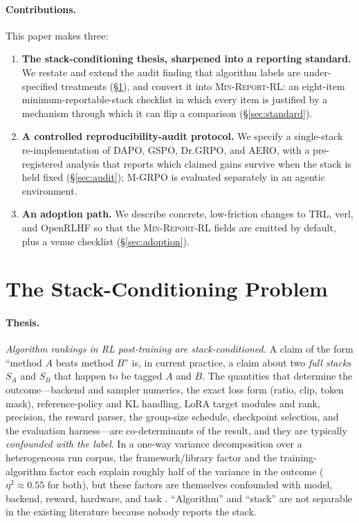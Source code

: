 \documentclass[11pt]{article}
\newcommand{\minreport}{\textsc{Min-Report-RL}}
\begin{document}
\paragraph{Contributions.}
This paper makes three:
\begin{enumerate}[leftmargin=1.6em, itemsep=2pt]
  \item \textbf{The stack-conditioning thesis, sharpened into a reporting
        standard.} We restate and extend the audit finding that algorithm
        labels are under-specified treatments (\S\ref{sec:stack}), and convert
        it into \minreport{}: an eight-item minimum-reportable-stack checklist
        in which every item is justified by a mechanism through which it can
        flip a comparison (\S\ref{sec:standard}).
  \item \textbf{A controlled reproducibility-audit protocol.} We specify a
        single-stack re-implementation of DAPO, GSPO, Dr.GRPO, and AERO,
        with a pre-registered analysis that reports which claimed gains survive
        when the stack is held fixed (\S\ref{sec:audit}); M-GRPO is evaluated
        separately in an agentic environment.
  \item \textbf{An adoption path.} We describe concrete, low-friction changes
        to TRL, verl, and OpenRLHF so that the \minreport{} fields are emitted
        by default, plus a venue checklist (\S\ref{sec:adoption}).
\end{enumerate}

\section{The Stack-Conditioning Problem}
\label{sec:stack}


\paragraph{Thesis.}
\emph{Algorithm rankings in RL post-training are stack-conditioned.} A claim of
the form ``method $A$ beats method $B$'' is, in current practice, a claim about
two \emph{full stacks} $S_A$ and $S_B$ that happen to be tagged $A$ and $B$. The
quantities that determine the outcome---backend and sampler numerics, the exact
loss form (ratio, clip, token mask), reference-policy and KL handling, LoRA
target modules and rank, precision, the reward parser, the group-size schedule,
checkpoint selection, and the evaluation harness---are co-determinants of the
result, and they are typically \emph{confounded with the label}. In a one-way
variance decomposition over a heterogeneous run corpus, the framework/library
factor and the training-algorithm factor each explain roughly half of the
variance in the outcome ($\eta^2 \approx 0.55$ for both), but these factors are
themselves confounded with model, backend, reward, hardware, and task
\cite{zvfaudit2026}. ``Algorithm'' and ``stack'' are not separable in the
existing literature because nobody reports the stack.
\end{document}
